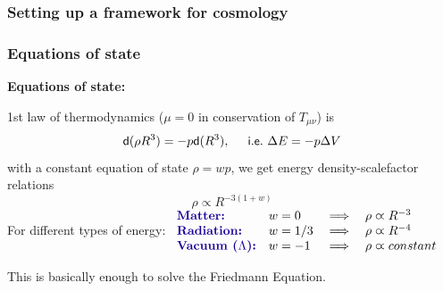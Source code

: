 \documentclass[xcolor=dvipsnames]{beamer}
\begin{document}
\begin{frame}
  \frametitle{Setting up a framework for cosmology}


  \vspace{4mm}

\end{frame}

\begin{frame}
  \frametitle{Equations of state}

  \textbf{Equations of state:}

  1st law of thermodynamics ($\mu=0$ in conservation of $T_{\mu\nu}$) is
  \begin{equation}
    \mathsf{d}(\rho R^3) = -p\mathsf{d}(R^3), \hspace{5mm}\mathsf{i.e.}\ \Delta E = -p\Delta V
  \end{equation}
  with a constant equation of state $\rho = wp$, we get energy density-scalefactor relations 
  \begin{equation}
    \rho \varpropto R^{-3(1+w)}
  \end{equation}
  For different types of energy:
  $\begin{array}{llcl}
  \mathsf{\textbf{\color[rgb]{0.1, 0.0, 0.6}Matter:}} &w=0 &\implies& \rho \varpropto R^{-3}\\
  \mathsf{\textbf{\color[rgb]{0.1, 0.0, 0.6}Radiation:}} &w=1/3 &\implies& \rho \varpropto R^{-4}\\
  \mathsf{\textbf{\color[rgb]{0.1, 0.0, 0.6}Vacuum ($\Lambda$):}} &w=-1 &\implies& \rho \varpropto constant
  \end{array}$

  \vspace{3mm}This is basically enough to solve the Friedmann Equation.

\end{frame}
\end{document}
